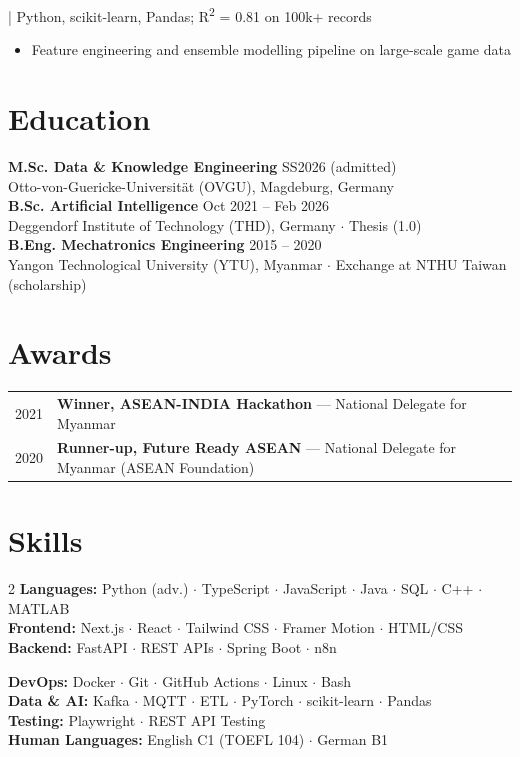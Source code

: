 \documentclass[10pt,a4paper]{article}
\newcommand{\project}[2]{%
  \noindent{\small\bfseries #1} {\footnotesize\color{lightgray}| #2}
}
\begin{document}
\project{Chess ELO Prediction}{Python, scikit-learn, Pandas; R\textsuperscript{2} = 0.81 on 100k+ records}
\begin{itemize}\small
  \item Feature engineering and ensemble modelling pipeline on large-scale game data
\end{itemize}

\section{Education}
\small\noindent
{\bfseries M.Sc. Data \& Knowledge Engineering} \hfill {\color{lightgray} SS2026 (admitted)}\\[-2pt]
{\color{accent}Otto-von-Guericke-Universität (OVGU)}, Magdeburg, Germany\\[2pt]
{\bfseries B.Sc. Artificial Intelligence} \hfill {\color{lightgray} Oct 2021 -- Feb 2026}\\[-2pt]
{\color{accent}Deggendorf Institute of Technology (THD)}, Germany $\cdot$ Thesis (1.0)\\[2pt]
{\bfseries B.Eng. Mechatronics Engineering} \hfill {\color{lightgray} 2015 -- 2020}\\[-2pt]
{\color{accent}Yangon Technological University (YTU)}, Myanmar $\cdot$ Exchange at NTHU Taiwan (scholarship)

\section{Awards}
\small\noindent
\begin{tabularx}{\textwidth}{@{}lX@{}}
2021 & \textbf{Winner, ASEAN-INDIA Hackathon} — National Delegate for Myanmar\\[-1pt]
2020 & \textbf{Runner-up, Future Ready ASEAN} — National Delegate for Myanmar (ASEAN Foundation)\\
\end{tabularx}

\section{Skills}
\begin{multicols}{2}
\small\noindent
{\color{accent}\bfseries Languages:} Python (adv.) $\cdot$ TypeScript $\cdot$ JavaScript $\cdot$ Java $\cdot$ SQL $\cdot$ C++ $\cdot$ MATLAB\\[1pt]
{\color{accent}\bfseries Frontend:} Next.js $\cdot$ React $\cdot$ Tailwind CSS $\cdot$ Framer Motion $\cdot$ HTML/CSS\\[1pt]
{\color{accent}\bfseries Backend:} FastAPI $\cdot$ REST APIs $\cdot$ Spring Boot $\cdot$ n8n

\columnbreak
{\color{accent}\bfseries DevOps:} Docker $\cdot$ Git $\cdot$ GitHub Actions $\cdot$ Linux $\cdot$ Bash\\[1pt]
{\color{accent}\bfseries Data \& AI:} Kafka $\cdot$ MQTT $\cdot$ ETL $\cdot$ PyTorch $\cdot$ scikit-learn $\cdot$ Pandas\\[1pt]
{\color{accent}\bfseries Testing:} Playwright $\cdot$ REST API Testing\\[1pt]
{\color{accent}\bfseries Human Languages:} English C1 (TOEFL 104) $\cdot$ German B1
\end{multicols}
\end{document}
